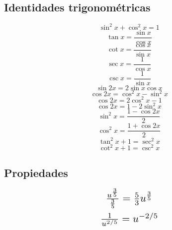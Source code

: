 \documentclass[a4paper,12pt,numbers=noenddot]{scrreprt}
\begin{document}
    \subsection*{Identidades trigonométricas}
    \begin{multicols}{3}
        \begin{equation*}
            \sin^2 x + \cos^2 x = 1
        \end{equation*}
        \begin{equation*}
            \tan x = \frac{\sin x}{\cos x}
        \end{equation*}
        \begin{equation*}
            \cot x = \frac{\cos x}{\sin x}
        \end{equation*}
        \begin{equation*}
            \sec x = \frac{1}{\cos x}
        \end{equation*}
        \begin{equation*}
            \csc x = \frac{1}{\sin x}
        \end{equation*}
        \begin{equation*}
            \sin 2x = 2 \sin x \cos x
        \end{equation*}
        \begin{equation*}
            \cos 2x = \cos^2 x - \sin^2 x
        \end{equation*}
        \begin{equation*}
            \cos 2x = 2 \cos^2 x - 1
        \end{equation*}
        \begin{equation*}
            \cos 2x = 1 - 2 \sin^2 x
        \end{equation*}
        \begin{equation*}
            \sin^2 x = \frac{1 - \cos 2x}{2}
        \end{equation*}
        \begin{equation*}
            \cos^2 x = \frac{1 + \cos 2x}{2}
        \end{equation*}
        \begin{equation*}
        \tan^2 x +1 = \sec^2 x
        \end{equation*}
        \begin{equation*}
            \cot^2 x + 1 = \csc^2 x
        \end{equation*}
    \end{multicols}

    \subsection*{Propiedades}
    \begin{multicols}{2}
        \begin{equation*}
            \scalebox{1.5}{$\frac{u^{\frac{3}{5}}}{\frac{3}{5}} = \frac{5}{3}u^{\frac{3}{5}}$}
        \end{equation*}
        \begin{equation*}
            \scalebox{1.5}{$\frac{1}{u^{2/5}} = u^{-2/5}$}
        \end{equation*}
    \end{multicols}
        
\end{document}
